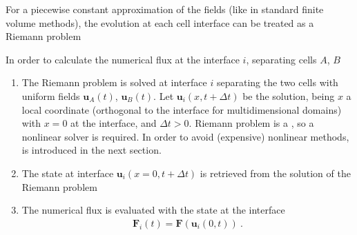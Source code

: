 \documentclass[letterpaper,10pt,english]{jupyterBook}
\begin{document}
\sphinxAtStartPar
For a piecewise constant approximation of the fields (like in standard finite volume methods), the evolution at each cell interface can be treated as a Riemann problem

\sphinxAtStartPar
In order to calculate the numerical flux at the interface \(i\), separating cells \(A\), \(B\)
\begin{enumerate}
%
\item {} 
\sphinxAtStartPar
The Riemann problem is solved at interface \(i\) separating the two cells with uniform fields \(\mathbf{u}_A(t)\), \(\mathbf{u}_B(t)\). Let \(\mathbf{u}_i(x,t+\Delta t)\) be the solution, being \(x\) a local coordinate (orthogonal to the interface for multi\sphinxhyphen{}dimensional domains) with \(x=0\) at the interface, and \(\Delta t > 0\). Riemann problem is a , so a non\sphinxhyphen{}linear solver is required. In order to avoid (expensive) non\sphinxhyphen{}linear methods, {\hyperref[\detokenize{ch/pde/fvm-hyperbolic-pde:pde-fvm-hyperbolic-flux-roe}]{}} is introduced in the next section.

\item {} 
\sphinxAtStartPar
The state at interface \(\mathbf{u}_i(x=0,t+\Delta t)\) is retrieved from the solution of the Riemann problem

\item {} 
\sphinxAtStartPar
The numerical flux is evaluated with the state at the interface
\begin{equation*}
\begin{split}\mathbf{F}_i(t) = \mathbf{F}(\mathbf{u}_i(0,t)) \ .\end{split}
\end{equation*}
\end{enumerate}
\end{document}
